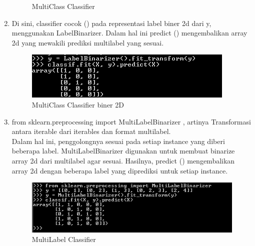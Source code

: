 \begin{enumerate}
\begin{figure}
\begin{center}
   	 \caption{MultiClass Classifier}
	\end{center}
\end{figure}
\item
Di sini, classifier cocok () pada representasi label biner 2d dari y, menggunakan LabelBinarizer. Dalam hal ini predict () mengembalikan array 2d yang mewakili prediksi multilabel yang sesuai.
\begin{figure}
	\begin{center}
   	 \includegraphics[scale=1]{figures/tasya18.png}
   	 \caption{MultiClass Classifier biner 2D}
	\end{center}
\end{figure}
\item
from sklearn.preprocessing import MultiLabelBinarizer , artinya Transformasi antara iterable dari iterables dan format multilabel.\\
Dalam hal ini, penggolongnya sesuai pada setiap instance yang diberi beberapa label. MultiLabelBinarizer digunakan untuk membuat binarize array 2d dari multilabel agar sesuai. Hasilnya, predict () mengembalikan array 2d dengan beberapa label yang diprediksi untuk setiap instance.
\begin{figure}
	\begin{center}
   	 \includegraphics[scale=1]{figures/tasya19.png}
   	 \caption{MultiLabel Classifier}
	\end{center}
\end{figure}
\end{enumerate}


